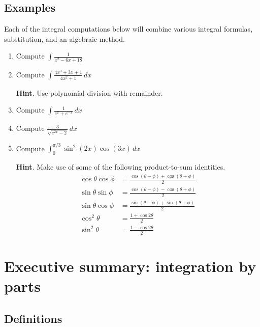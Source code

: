 \newpage



\subsection*{Examples}
Each of the integral computations below will combine various integral formulas, substitution, and an algebraic method.
\begin{enumerate}
  \item Compute $\displaystyle \int \frac{1}{x^2-6x+18}$
  \item Compute $\displaystyle \int \frac{4x^3+3x+1}{4x^2+1}\, dx$

  {\bf Hint}. Use polynomial division with remainder.
  \item Compute $\displaystyle\int \frac{1}{e^x+e^{-x}}\, dx$
  \item Compute $\displaystyle \frac{3}{\sqrt{e^{2x}-2}}\, dx$

  \item Compute $\displaystyle \int_0^{\pi/3}\sin^2(2x)\cos(3x) \, dx$

  {\bf Hint}. Make use of some of the following product-to-sum identities.
  \begin{align}
    \cos\theta\cos\phi&=\frac{\cos(\theta-\phi)+\cos(\theta+\phi)}{2} \\
    \sin\theta\sin\phi&=\frac{\cos(\theta-\phi)-\cos(\theta+\phi)}{2} \\
    \sin\theta\cos\phi&= \frac{\sin(\theta-\phi)+\sin(\theta+\phi)}{2}\\
    \cos^2\theta&=\frac{1+\cos2\theta}{2}\\
    \sin^2\theta&=\frac{1-\cos2\theta}{2}
  \end{align}

\end{enumerate}




\newpage

\section{Executive summary: integration by parts}

\thispagestyle{fancy}
\subsection*{Definitions}


